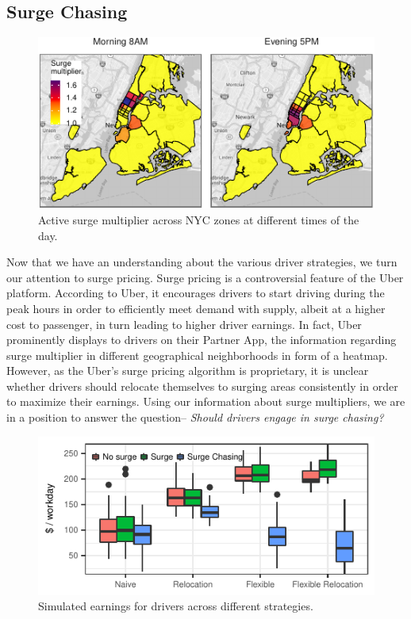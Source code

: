 \subsection{Surge Chasing}
\begin{figure}[H]
	\centering
	\includegraphics{figures/surge_heatmap.pdf}
	\caption{Active surge multiplier across NYC zones at different times of the day.}
	\label{fig:surge_heatmap}
\end{figure}
Now that we have an understanding about the various driver strategies, we turn our attention to surge pricing. Surge pricing is a controversial feature of the Uber platform. According to Uber, it encourages drivers to start driving during the peak hours in order to efficiently meet demand with supply, albeit at a higher cost to passenger, in turn leading to higher driver earnings. In fact, Uber prominently displays to drivers on their Partner App, the information regarding surge multiplier in different geographical neighborhoods in form of a heatmap. However, as the Uber's surge pricing algorithm is proprietary, it is unclear whether drivers should relocate themselves to surging areas consistently in order to maximize their earnings. Using our information about surge multipliers, we are in a position to answer the question-- \textit{Should drivers engage in surge chasing?}
\begin{figure}[H]
	\includegraphics{figures/simulated_earnings.pdf}
	\caption{Simulated earnings for drivers across different strategies.}
	\label{fig:simulated_earnings}
\end{figure}
